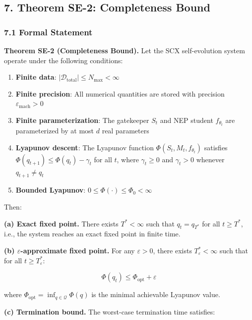 \documentclass[
  12pt,
]{article}
\providecommand{\tightlist}{%
  \setlength{\itemsep}{0pt}\setlength{\parskip}{0pt}}
\begin{document}
\subsection{7. Theorem SE-2: Completeness
Bound}\label{theorem-se-2-completeness-bound}

\subsubsection{7.1 Formal Statement}\label{formal-statement}

\textbf{Theorem SE-2 (Completeness Bound).} Let the SCX self-evolution
system operate under the following conditions:

\begin{enumerate}
\def\labelenumi{\arabic{enumi}.}
\tightlist
\item
  \textbf{Finite data}:
  \(|\mathcal{D}_{\text{total}}| \leq N_{\text{max}} < \infty\)
\item
  \textbf{Finite precision}: All numerical quantities are stored with
  precision \(\varepsilon_{\text{mach}} > 0\)
\item
  \textbf{Finite parameterization}: The gatekeeper \(S_t\) and NEP
  student \(f_{\theta_t}\) are parameterized by at most \(d\) real
  parameters
\item
  \textbf{Lyapunov descent}: The Lyapunov function
  \(\Phi(S_t, M_t, f_{\theta_t})\) satisfies
  \(\Phi(q_{t+1}) \leq \Phi(q_t) - \gamma_t\) for all \(t\), where
  \(\gamma_t \geq 0\) and \(\gamma_t > 0\) whenever \(q_{t+1} \neq q_t\)
\item
  \textbf{Bounded Lyapunov}: \(0 \leq \Phi(\cdot) \leq \Phi_0 < \infty\)
\end{enumerate}

Then:

\textbf{(a) Exact fixed point.} There exists \(T^* < \infty\) such that
\(q_t = q_{T^*}\) for all \(t \geq T^*\), i.e., the system reaches an
exact fixed point in finite time.

\textbf{(b) \(\varepsilon\)-approximate fixed point.} For any
\(\varepsilon > 0\), there exists \(T_\varepsilon^* < \infty\) such that
for all \(t \geq T_\varepsilon^*\):

\[\Phi(q_t) \leq \Phi_{\text{opt}} + \varepsilon\]

where \(\Phi_{\text{opt}} = \inf_{q \in \mathcal{Q}} \Phi(q)\) is the
minimal achievable Lyapunov value.

\textbf{(c) Termination bound.} The worst-case termination time
satisfies:
\end{document}
